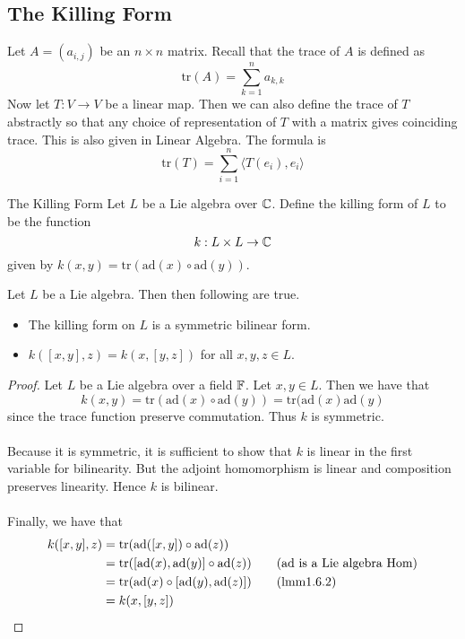 \documentclass[a4paper]{article}
\begin{document}
\subsection{The Killing Form}
Let $A=(a_{i,j})$ be an $n\times n$ matrix. Recall that the trace of $A$ is defined as $$\text{tr}(A)=\sum_{k=1}^na_{k,k}$$ Now let $T:V\to V$ be a linear map. Then we can also define the trace of $T$ abstractly so that any choice of representation of $T$ with a matrix gives coinciding trace. This is also given in Linear Algebra. The formula is $$\text{tr}(T)=\sum_{i=1}^n\langle T(e_i),e_i\rangle$$

\begin{defn}{The Killing Form}{} Let $L$ be a Lie algebra over $\mathbb{C}$. Define the killing form of $L$ to be the function $$k:L\times L\to\mathbb{C}$$ given by $k(x,y)=\text{tr}(\text{ad}(x)\circ\text{ad}(y))$. 
\end{defn}

\begin{lmm}{}{} Let $L$ be a Lie algebra. Then then following are true. 
\begin{itemize}
\item The killing form on $L$ is a symmetric bilinear form. 
\item $k([x,y],z)=k(x,[y,z])$ for all $x,y,z\in L$. 
\end{itemize} \tcbline
\begin{proof}
Let $L$ be a Lie algebra over a field $\mathbb{F}$. Let $x,y\in L$. Then we have that $$k(x,y)=\text{tr}(\text{ad}(x)\circ\text{ad}(y))=\text{tr}(\text{ad}(x)\text{ad}(y)$$ since the trace function preserve commutation. Thus $k$ is symmetric. \\~\\

Because it is symmetric, it is sufficient to show that $k$ is linear in the first variable for bilinearity. But the adjoint homomorphism is linear and composition preserves linearity. Hence $k$ is bilinear. \\~\\

Finally, we have that 
\begin{align*}
k([x,y],z)&=\text{tr}(\text{ad}([x,y])\circ\text{ad}(z))\\
&=\text{tr}([\text{ad}(x),\text{ad}(y)]\circ\text{ad}(z))\tag{$\text{ad}$ is a Lie algebra Hom}\\
&=\text{tr}(\text{ad}(x)\circ[\text{ad}(y),\text{ad}(z)])\tag{lmm1.6.2}\\
&=k(x,[y,z])
\end{align*}
\end{proof}
\end{lmm}
\end{document}
